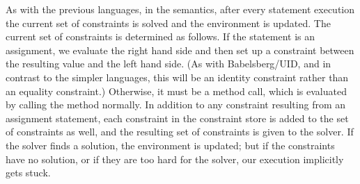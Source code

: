 \documentclass{article}
\def\ab#1{\textcolor{red}{\textsf{AB: #1}}}
\begin{document}
As with the previous languages, in the semantics, after every
statement execution the current set of constraints is solved and the
environment is updated.  The current set of constraints is determined
as follows.  If the statement is an assignment, we evaluate the right
hand side and then set up a constraint between the resulting value and
the left hand side.  (As with Babelsberg/UID, and in contrast to the
simpler languages, this will be an identity constraint rather than an
equality constraint.)  Otherwise, it must be a method call, which is
evaluated by calling the method normally.
In addition to any constraint resulting from an
assignment statement, each constraint in the constraint store is added
to the set of constraints as well, and the resulting set of
constraints is given to the solver.  If the solver finds a solution,
the environment is updated; but if the constraints have no solution,
or if they are too hard for the solver, our execution implicitly gets stuck.


\end{document}
